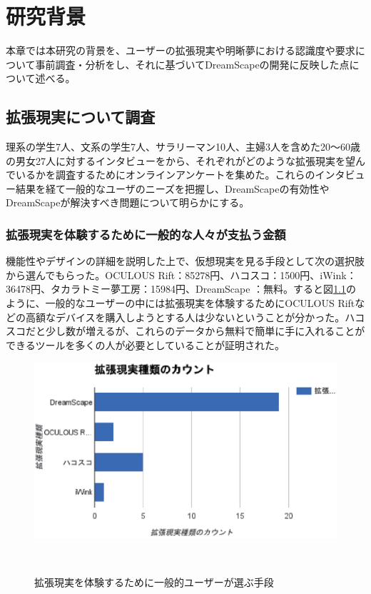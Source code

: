 \chapter{研究背景}
\label{chap:webapi}

本章では本研究の背景を、ユーザーの拡張現実や明晰夢における認識度や要求について事前調査・分析をし、それに基づいてDreamScapeの開発に反映した点について述べる。

\section{拡張現実について調査}
理系の学生7人、文系の学生7人、サラリーマン10人、主婦3人を含めた20〜60歳の男女27人に対するインタビューをから、それぞれがどのような拡張現実を望んでいるかを調査するためにオンラインアンケートを集めた。これらのインタビュー結果を経て一般的なユーザのニーズを把握し、DreamScapeの有効性やDreamScapeが解決すべき問題について明らかにする。

\subsection{拡張現実を体験するために一般的な人々が支払う金額}
機能性やデザインの詳細を説明した上で、仮想現実を見る手段として次の選択肢から選んでもらった。OCULOUS Rift：85278円、ハコスコ：1500円、iWink：36478円、タカラトミー夢工房：15984円、DreamScape ：無料。すると図\ref{userNeedCost}のように、一般的なユーザーの中には拡張現実を体験するためにOCULOUS Riftなどの高額なデバイスを購入しようとする人は少ないということが分かった。ハコスコだと少し数が増えるが、これらのデータから無料で簡単に手に入れることができるツールを多くの人が必要としていることが証明された。

\begin{figure}[htbp]
\begin{center}
\includegraphics[width=15cm]{eps/VRselection.eps}
\caption{拡張現実を体験するために一般的ユーザーが選ぶ手段}
　\label{userNeedCost}
\end{center}
\end{figure}

